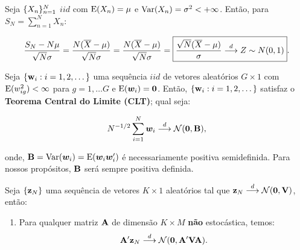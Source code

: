\documentclass[11pt, oneside, a4paper, article]{article}
\numberwithin{equation}{section}
\begin{document}
\begin{description}
\begin{defn}
	Seja $\{X_{n}\}_{n = 1}^{N}$ $iid$ com $\text{E}(X_{n}) = \mu$ e $\text{Var}(X_{n}) = \sigma^{2} < + \infty$.
	Então, para $S_{N} = \sum_{n=1}^{N} X_{n}$:

	\begin{align*}
		\frac{S_{N} - N \mu }{ \sqrt{N} \sigma}
		=
		\frac{N ( \overline{X} - \mu ) }{ \sqrt{N} \sigma}
		=
		\frac{N ( \overline{X} - \mu ) }{ \sqrt{N} \sigma}
		=
		\boxed{
			\frac{\sqrt{N} ( \overline{X} - \mu ) }{\sigma}
		 \overset{d}{\longrightarrow}  Z \sim N(0,1)}.
	\end{align*}
\end{defn}

\begin{teo} \label{def:tcl:vec}
	\citet[Teo 3.2, p.40]{wool-2010}

	Seja $\{\mathbf{w}_{i}:i=1,2,\dots\}$ uma sequência $iid$ de vetores aleatórios $G \times 1$ com
	$\text{E}( w_{ig}^{2} ) < \infty$ para $g= 1, \dots G$ 
	e
	$\text{E}( \boldsymbol{w}_{i} ) = \boldsymbol{0}$.
	Então, $\{\mathbf{w}_{i}:i=1,2,\dots\}$ satisfaz o \textbf{Teorema Central do Limite (CLT)}; 
	qual seja:

	\vspace{-1 em}
	\begin{align*}
		N^{-1/2} \sum_{i=1}^{N} \boldsymbol{w}_{i}  \overset{d}{\longrightarrow}  \mathcal{N}(\boldsymbol{0}, \mathbf{B}),
	\end{align*}

	\noindent
	onde, $\mathbf{B} = \text{Var}(\boldsymbol{w}_{i}) = \text{E}( \boldsymbol{w}_{i} \boldsymbol{w}_{i}')$ é necessariamente positiva semidefinida.
	Para nossos propósitos, $\mathbf{B}$ será sempre positiva definida.
\end{teo}

\begin{cor}[]
	\citet[Cor 3.2, p.39]{wool-2010}

	Seja $\{\mathbf{z}_{N}\}$ uma sequência de vetores $K \times 1$ aleatórios tal que
	$\mathbf{z}_{N}  \overset{d}{\longrightarrow}  \mathcal{N}(\boldsymbol{0}, \mathbf{V})$, então:

	\begin{enumerate}
		\item 
			Para qualquer matriz $\mathbf{A}$ de dimensão $K \times M$ \textbf{não} estocástica, temos:
			\begin{align*}
				\mathbf{A}' \mathbf{z}_{N}  \overset{d}{\longrightarrow}  \mathcal{N}(\boldsymbol{0}, \mathbf{A}'\mathbf{V}\mathbf{A}).
			\end{align*}


\end{enumerate}
\end{cor}
\end{description}
\end{document}
